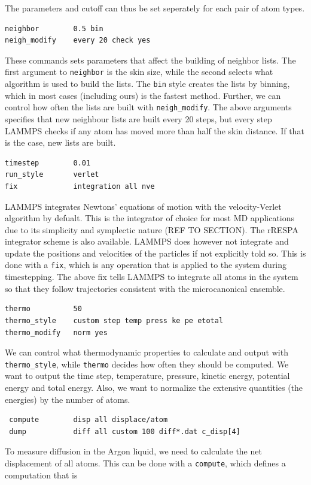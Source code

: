 \documentclass[twoside,english]{uiofysmaster}
\begin{document}
The parameters and cutoff can thus be set seperately 
for each pair of atom types.
\begin{lstlisting}
neighbor		0.5 bin
neigh_modify	every 20 check yes
\end{lstlisting}
These commands sets parameters that affect the 
building of neighbor lists. The first argument
to \texttt{neighbor} is the skin size, while the 
second selects what algorithm is used
to build the lists. The \texttt{bin} style creates 
the lists by binning, which in most cases
(including ours) is the fastest method. 
Further, we can control how often the lists
are built with \texttt{neigh\_modify}. The above arguments
specifies that new neighbour lists are built 
every 20 steps, but every step LAMMPS checks
if any atom has moved more than half the skin distance.
If that is the case, new lists are built. 
\begin{lstlisting}
timestep 		0.01
run_style 		verlet
fix 			integration all nve
\end{lstlisting}
LAMMPS integrates Newtons' equations of motion
with the velocity-Verlet algorithm by defualt. 
This is the integrator of choice for most MD
applications due to its simplicity and 
symplectic nature (REF TO SECTION). The 
rRESPA integrator \cite{Tuckerman92} scheme is also available.
LAMMPS does however not integrate and update
the positions and velocities of the particles
if not explicitly told so. This is done with
a \texttt{fix}, which is any operation that is applied to the 
system during timestepping. The above fix 
tells LAMMPS to integrate all atoms in the system 
so that they follow trajectories consistent with 
the microcanonical ensemble. 
\begin{lstlisting}
thermo			50
thermo_style 	custom step temp press ke pe etotal 
thermo_modify 	norm yes
\end{lstlisting}
We can control what thermodynamic properties 
to calculate and output with \texttt{thermo\_style}, while 
\texttt{thermo} decides how often they should be computed. 
We want to output the time step, temperature, 
pressure, kinetic energy, potential energy and total
energy. Also, we want to normalize the extensive
quantities (the energies) by the number of atoms. 
\begin{lstlisting}
 compute 		disp all displace/atom
 dump 			diff all custom 100 diff*.dat c_disp[4]
\end{lstlisting}
To measure diffusion in the 
Argon liquid, we need to calculate the net
displacement of all atoms. This can be done with a 
\texttt{compute}, which defines a computation that is 
\end{document}
